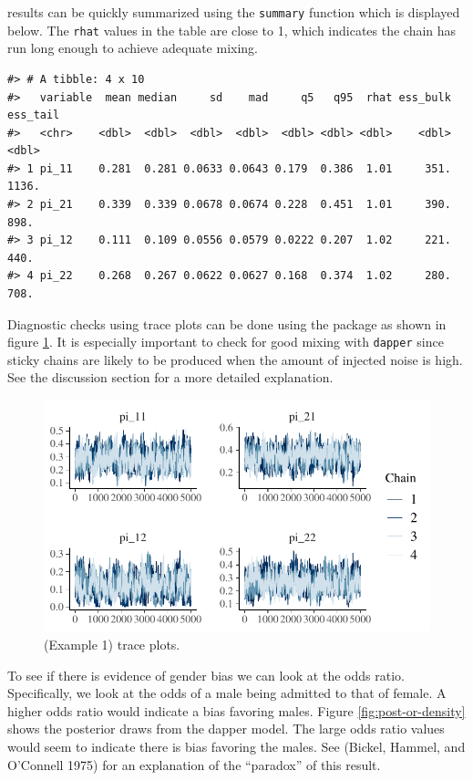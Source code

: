 results can be quickly summarized using the \texttt{summary} function which is
displayed below. The \texttt{rhat} values in the table are close to 1, which indicates
the chain has run long enough to achieve adequate mixing.

\begin{verbatim}
#> # A tibble: 4 x 10
#>   variable  mean median     sd    mad     q5   q95  rhat ess_bulk ess_tail
#>   <chr>    <dbl>  <dbl>  <dbl>  <dbl>  <dbl> <dbl> <dbl>    <dbl>    <dbl>
#> 1 pi_11    0.281  0.281 0.0633 0.0643 0.179  0.386  1.01     351.    1136.
#> 2 pi_21    0.339  0.339 0.0678 0.0674 0.228  0.451  1.01     390.     898.
#> 3 pi_12    0.111  0.109 0.0556 0.0579 0.0222 0.207  1.02     221.     440.
#> 4 pi_22    0.268  0.267 0.0622 0.0627 0.168  0.374  1.02     280.     708.
\end{verbatim}

Diagnostic checks using trace plots can be done using the  package
as shown in figure \ref{fig:trace-plot}. It is especially important to check for good mixing
with \texttt{dapper} since sticky chains are likely to be produced
when the amount of injected noise is high. See the discussion section
for a more detailed explanation.

\begin{figure}

{\centering \includegraphics{dppaper_files/figure-latex/trace-plot-1} 

}

\caption{(Example 1) trace plots.}\label{fig:trace-plot}
\end{figure}

To see if there is evidence of gender bias we can look at the odds ratio.
Specifically, we look at the odds of a male being admitted to
that of female. A higher odds ratio would indicate a bias
favoring males. Figure \ref{fig:post-or-density} shows the posterior draws
from the dapper model. The large odds ratio values would seem
to indicate there is bias favoring the males. See (Bickel, Hammel, and O'Connell 1975) for
an explanation of the ``paradox'' of this result.

